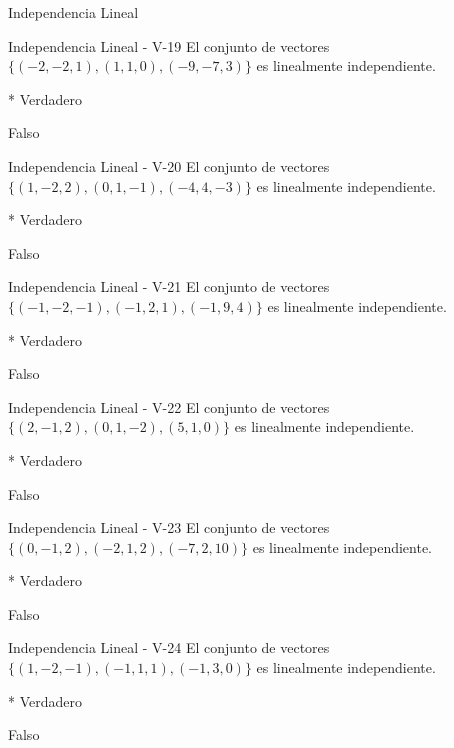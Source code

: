 \documentclass[a4,11pt]{aleph-notas}
\begin{document}
\begin{quiz}{Independencia Lineal}
\begin{multi}[numbering = none, shuffle = false]%
    {Independencia Lineal - V-19}
    El conjunto de vectores $\{ (-2,-2,1) , (1,1,0), (-9, -7, 3) \}$ es linealmente independiente.
    \item[]* Verdadero 
    \item[] Falso
\end{multi}

\begin{multi}[numbering = none, shuffle = false]%
    {Independencia Lineal - V-20}
    El conjunto de vectores $\{ (1,-2,2) , (0,1,-1), (-4, 4, -3) \}$ es linealmente independiente.
    \item[]* Verdadero 
    \item[] Falso
\end{multi}

\begin{multi}[numbering = none, shuffle = false]%
    {Independencia Lineal - V-21}
    El conjunto de vectores $\{ (-1,-2,-1) , (-1,2,1), (-1, 9, 4) \}$ es linealmente independiente.
    \item[]* Verdadero 
    \item[] Falso
\end{multi}

\begin{multi}[numbering = none, shuffle = false]%
    {Independencia Lineal - V-22}
    El conjunto de vectores $\{ (2,-1,2) , (0,1,-2), (5, 1, 0) \}$ es linealmente independiente.
    \item[]* Verdadero 
    \item[] Falso
\end{multi}

\begin{multi}[numbering = none, shuffle = false]%
    {Independencia Lineal - V-23}
    El conjunto de vectores $\{ (0,-1,2) , (-2,1,2), (-7, 2, 10) \}$ es linealmente independiente.
    \item[]* Verdadero 
    \item[] Falso
\end{multi}

\begin{multi}[numbering = none, shuffle = false]%
    {Independencia Lineal - V-24}
    El conjunto de vectores $\{ (1,-2,-1) , (-1,1,1), (-1, 3, 0) \}$ es linealmente independiente.
    \item[]* Verdadero 
    \item[] Falso
\end{multi}


\end{quiz}
\end{document}
